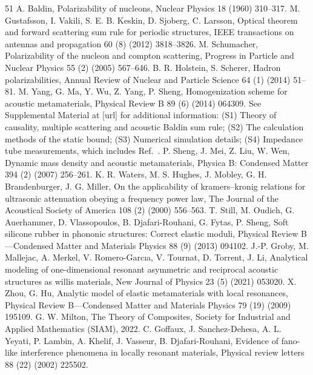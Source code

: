 \documentclass[final,5p,times,twocolumn]{elsarticle}
\begin{document}
\begin{thebibliography}{51}
	 A. Baldin, Polarizability of nucleons, Nuclear Physics 18 (1960) 310--317.
	 M. Gustafsson, I. Vakili, S. E. B. Keskin, D. Sjoberg, C. Larsson, Optical theorem and forward scattering sum rule for periodic structures, IEEE transactions on antennas and propagation 60 (8) (2012) 3818--3826.
	 M. Schumacher, Polarizability of the nucleon and compton scattering, Progress in Particle and Nuclear Physics 55 (2) (2005) 567--646.
	 B. R. Holstein, S. Scherer, Hadron polarizabilities, Annual Review of Nuclear and Particle Science 64 (1) (2014) 51--81.
	 M. Yang, G. Ma, Y. Wu, Z. Yang, P. Sheng, Homogenization scheme for acoustic metamaterials, Physical Review B 89 (6) (2014) 064309.
	 See Supplemental Material at [url] for additional information: (S1) Theory of causality, multiple scattering and acoustic Baldin sum rule; (S2) The calculation methods of the static bound; (S3) Numerical simulation details; (S4) Impedance tube measurements, which includes Ref.~\cite{sheng2007dynamic}.
	 P. Sheng, J. Mei, Z. Liu, W. Wen, Dynamic mass density and acoustic metamaterials, Physica B: Condensed Matter 394 (2) (2007) 256--261.
	 K. R. Waters, M. S. Hughes, J. Mobley, G. H. Brandenburger, J. G. Miller, On the applicability of kramers--kronig relations for ultrasonic attenuation obeying a frequency power law, The Journal of the Acoustical Society of America 108 (2) (2000) 556--563.
	 T. Still, M. Oudich, G. Auerhammer, D. Vlassopoulos, B. Djafari-Rouhani, G. Fytas, P. Sheng, Soft silicone rubber in phononic structures: Correct elastic moduli, Physical Review B---Condensed Matter and Materials Physics 88 (9) (2013) 094102.
	 J.-P. Groby, M. Mallejac, A. Merkel, V. Romero-Garcıa, V. Tournat, D. Torrent, J. Li, Analytical modeling of one-dimensional resonant asymmetric and reciprocal acoustic structures as willis materials, New Journal of Physics 23 (5) (2021) 053020.
	 X. Zhou, G. Hu, Analytic model of elastic metamaterials with local resonances, Physical Review B---Condensed Matter and Materials Physics 79 (19) (2009) 195109.
	 G. W. Milton, The Theory of Composites, Society for Industrial and Applied Mathematics (SIAM), 2022.
	 C. Goffaux, J. Sanchez-Dehesa, A. L. Yeyati, P. Lambin, A. Khelif, J. Vasseur, B. Djafari-Rouhani, Evidence of fano-like interference phenomena in locally resonant materials, Physical review letters 88 (22) (2002) 225502.

\end{thebibliography}
\end{document}
